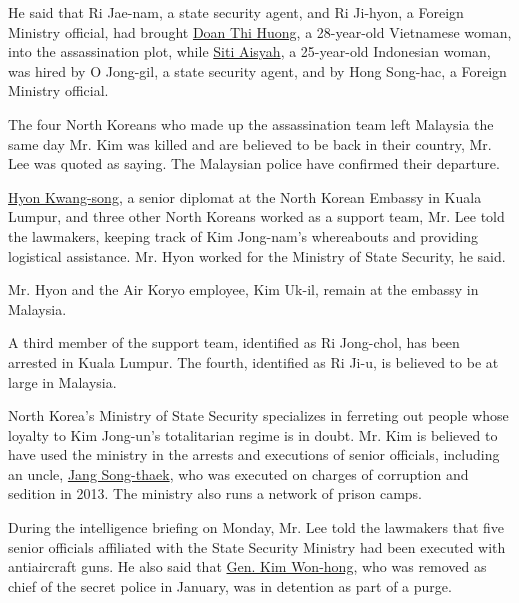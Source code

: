 He said that Ri Jae-nam, a state security agent, and Ri Ji-hyon, a
Foreign Ministry official, had brought
\href{https://www.nytimes3xbfgragh.onion/2017/02/24/world/asia/kim-jong-nam-suspect-doan-thi-huong.html}{Doan
Thi Huong}, a 28-year-old Vietnamese woman, into the assassination plot,
while
\href{https://www.nytimes3xbfgragh.onion/2017/02/25/world/asia/north-korea-kim-jong-nam-vx-nerve-agent-siti-aisyah.html}{Siti
Aisyah}, a 25-year-old Indonesian woman, was hired by O Jong-gil, a
state security agent, and by Hong Song-hac, a Foreign Ministry official.

The four North Koreans who made up the assassination team left Malaysia
the same day Mr. Kim was killed and are believed to be back in their
country, Mr. Lee was quoted as saying. The Malaysian police have
confirmed their departure.

\href{https://www.nytimes3xbfgragh.onion/2017/02/21/world/asia/kim-jong-nam-killing-malaysia-north-korea.html?rref=collection\%2Ftimestopic\%2FKim\%20Jong-un\&action=click\&contentCollection=timestopics\&region=stream\&module=stream_unit\&version=latest\&contentPlacement=9\&pgtype=collection}{Hyon
Kwang-song}, a senior diplomat at the North Korean Embassy in Kuala
Lumpur, and three other North Koreans worked as a support team, Mr. Lee
told the lawmakers, keeping track of Kim Jong-nam's whereabouts and
providing logistical assistance. Mr. Hyon worked for the Ministry of
State Security, he said.

Mr. Hyon and the Air Koryo employee, Kim Uk-il, remain at the embassy in
Malaysia.

A third member of the support team, identified as Ri Jong-chol, has been
arrested in Kuala Lumpur. The fourth, identified as Ri Ji-u, is believed
to be at large in Malaysia.

North Korea's Ministry of State Security specializes in ferreting out
people whose loyalty to Kim Jong-un's totalitarian regime is in doubt.
Mr. Kim is believed to have used the ministry in the arrests and
executions of senior officials, including an uncle,
\href{http://www.nytimes3xbfgragh.onion/2013/12/13/world/asia/north-korea-says-uncle-of-executed.html}{Jang
Song-thaek}, who was executed on charges of corruption and sedition in
2013. The ministry also runs a network of prison camps.

During the intelligence briefing on Monday, Mr. Lee told the lawmakers
that five senior officials affiliated with the State Security Ministry
had been executed with antiaircraft guns. He also said that
\href{https://www.nytimes3xbfgragh.onion/2017/02/03/world/asia/north-korea-purge-kim-jong-un-kim-won-hong.html?_r=0}{Gen.
Kim Won-hong}, who was removed as chief of the secret police in January,
was in detention as part of a purge.

